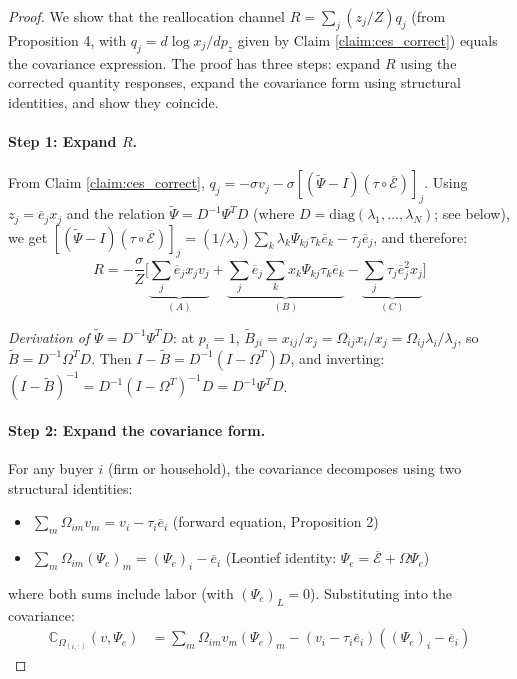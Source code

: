 \documentclass[11pt]{article}
\begin{document}
\begin{proof}
We show that the reallocation channel $R = \sum_j (z_j/Z) q_j$ (from Proposition 4, with $q_j = d\log x_j/dp_z$ given by Claim \ref{claim:ces_correct}) equals the covariance expression. The proof has three steps: expand $R$ using the corrected quantity responses, expand the covariance form using structural identities, and show they coincide.

\paragraph{Step 1: Expand $R$.}
From Claim \ref{claim:ces_correct}, $q_j = -\sigma v_j - \sigma[(\widetilde{\Psi} - I)(\tau \circ \overline{\mathcal{E}})]_j$. Using $z_j = \overline{e}_j x_j$ and the relation $\widetilde{\Psi} = D^{-1}\Psi^T D$ (where $D = \text{diag}(\lambda_1,...,\lambda_N)$; see below), we get $[(\widetilde{\Psi} - I)(\tau \circ \overline{\mathcal{E}})]_j = (1/\lambda_j)\sum_k\lambda_k\Psi_{kj}\tau_k\overline{e}_k - \tau_j\overline{e}_j$, and therefore:
\begin{equation}
    \label{eq:R_three_terms}
    R = -\frac{\sigma}{Z}\bigg[\underbrace{\sum_j \overline{e}_j x_j v_j}_{(A)} + \underbrace{\sum_j \overline{e}_j\sum_k x_k\Psi_{kj}\tau_k\overline{e}_k}_{(B)} - \underbrace{\sum_j \tau_j\overline{e}_j^2 x_j}_{(C)}\bigg]
\end{equation}

\textit{Derivation of $\widetilde{\Psi} = D^{-1}\Psi^T D$}: at $p_i = 1$, $\widetilde{B}_{ji} = x_{ij}/x_j = \Omega_{ij}x_i/x_j = \Omega_{ij}\lambda_i/\lambda_j$, so $\widetilde{B} = D^{-1}\Omega^T D$. Then $I - \widetilde{B} = D^{-1}(I - \Omega^T)D$, and inverting: $(I - \widetilde{B})^{-1} = D^{-1}(I-\Omega^T)^{-1}D = D^{-1}\Psi^T D$.

\paragraph{Step 2: Expand the covariance form.}
For any buyer $i$ (firm or household), the covariance decomposes using two structural identities:
\begin{itemize}
    \item $\sum_m \Omega_{im}v_m = v_i - \tau_i\overline{e}_i$ \hfill (forward equation, Proposition 2)
    \item $\sum_m \Omega_{im}(\Psi_e)_m = (\Psi_e)_i - \overline{e}_i$ \hfill (Leontief identity: $\Psi_e = \overline{\mathcal{E}} + \Omega\Psi_e$)
\end{itemize}
where both sums include labor (with $(\Psi_e)_L = 0$). Substituting into the covariance:
\begin{align*}
    \mathbb{C}_{\Omega_{(i,:)}}(v, \Psi_e) &= \sum_m \Omega_{im}v_m(\Psi_e)_m - (v_i - \tau_i\overline{e}_i)((\Psi_e)_i - \overline{e}_i)
\end{align*}


\end{proof}
\end{document}
